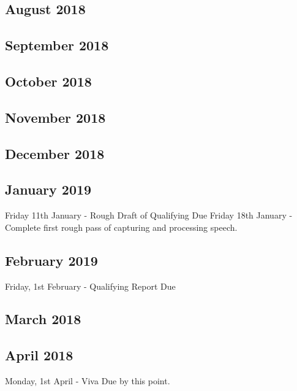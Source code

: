 \documentclass{article}
\begin{document}
	\subsection{August 2018}
	
	\subsection{September 2018}
	
	\subsection{October 2018}

	\subsection{November 2018}
	
	\subsection{December 2018}	
	
	\subsection{January 2019}
	Friday 11th January - Rough Draft of Qualifying Due
	Friday 18th January - Complete first rough pass of capturing and processing speech.
	
	\subsection{February 2019}
	Friday, 1st February - Qualifying Report Due
	
	\subsection{March 2018}
	
	\subsection{April 2018}
	Monday, 1st April - Viva Due by this point.
\end{document}
